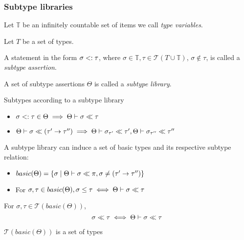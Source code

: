\documentclass[main.tex]{subfiles}
\begin{document}
\subsubsection{Subtype libraries}
\begin{defn}
    Let $\mathbb{T}$ be an infinitely countable set of items we call
    \emph{type variables}.

    Let $T$ be a set of types.

    A statement in the form $\sigma <: \tau$, where
    $\sigma \in \mathbb{T}, \tau \in \mathcal{T}(T \cup \mathbb{T})$,
    $\sigma \not\in \tau$,
    is called a \emph{subtype assertion}.

    A set of subtype assertions $\Theta$ is called a \emph{subtype library}.
\end{defn}

\begin{defn}
    Subtypes according to a subtype library
    \begin{itemize}
        \item $\sigma <: \tau \in \Theta
            \implies \Theta \vdash \sigma \ll \tau$
        \item $\Theta \vdash \sigma \ll (\tau' \rightarrow \tau'')
            \implies \Theta \vdash \sigma_{\tau'} \ll \tau',
            \Theta \vdash \sigma_{\tau''} \ll \tau''$
    \end{itemize}
\end{defn}

\begin{defn}
    A subtype library can induce a set of basic types and its respective
    subtype relation:
    \begin{itemize}
        \item $basic(\Theta) = \{ \sigma \mid
            \Theta \vdash \sigma \ll \pi, \sigma \neq (\tau' \rightarrow \tau'') \} $
        \item For $\sigma, \tau \in basic(\Theta),
            \sigma \leq \tau \iff \Theta \vdash \sigma \ll \tau$
    \end{itemize}
\end{defn}

\begin{prop}
    For $\sigma, \tau \in \mathcal{T}(basic(\Theta))$,
    \[ \sigma \ll \tau \iff \Theta \vdash \sigma \ll \tau \]
\end{prop}

\begin{prop}
    $\mathcal{T}(basic(\Theta))$ is a set of types
\end{prop}
\end{document}
